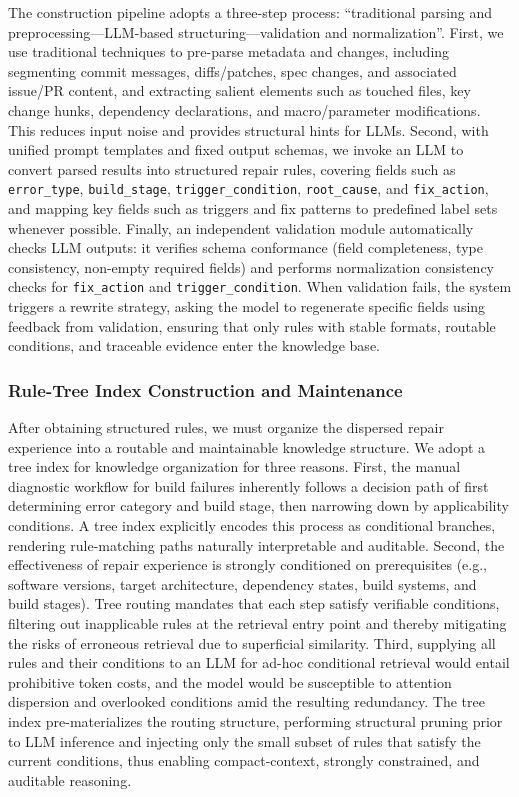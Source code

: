 \documentclass[sigconf]{acmart}
\begin{document}
\begin{sloppypar}
The construction pipeline adopts a three-step process: ``traditional parsing and preprocessing---LLM-based structuring---validation and normalization''. First, we use traditional techniques to pre-parse metadata and changes, including segmenting commit messages, diffs/patches, spec changes, and associated issue/PR content, and extracting salient elements such as touched files, key change hunks, dependency declarations, and macro/parameter modifications. This reduces input noise and provides structural hints for LLMs. Second, with unified prompt templates and fixed output schemas, we invoke an LLM to convert parsed results into structured repair rules, covering fields such as \texttt{error\_type}, \texttt{build\_stage}, \texttt{trigger\_condition}, \texttt{root\_cause}, and \texttt{fix\_action}, and mapping key fields such as triggers and fix patterns to predefined label sets whenever possible. Finally, an independent validation module automatically checks LLM outputs: it verifies schema conformance (field completeness, type consistency, non-empty required fields) and performs normalization consistency checks for \texttt{fix\_action} and \texttt{trigger\_condition}. When validation fails, the system triggers a rewrite strategy, asking the model to regenerate specific fields using feedback from validation, ensuring that only rules with stable formats, routable conditions, and traceable evidence enter the knowledge base.
\end{sloppypar}

\subsubsection{Rule-Tree Index Construction and Maintenance}

After obtaining structured rules, we must organize the dispersed repair experience into a routable and maintainable knowledge structure. We adopt a tree index for knowledge organization for three reasons. First, the manual diagnostic workflow for build failures inherently follows a decision path of first determining error category and build stage, then narrowing down by applicability conditions. A tree index explicitly encodes this process as conditional branches, rendering rule-matching paths naturally interpretable and auditable. Second, the effectiveness of repair experience is strongly conditioned on prerequisites (e.g., software versions, target architecture, dependency states, build systems, and build stages). Tree routing mandates that each step satisfy verifiable conditions, filtering out inapplicable rules at the retrieval entry point and thereby mitigating the risks of erroneous retrieval due to superficial similarity. Third, supplying all rules and their conditions to an LLM for ad-hoc conditional retrieval would entail prohibitive token costs, and the model would be susceptible to attention dispersion and overlooked conditions amid the resulting redundancy. The tree index pre-materializes the routing structure, performing structural pruning prior to LLM inference and injecting only the small subset of rules that satisfy the current conditions, thus enabling compact-context, strongly constrained, and auditable reasoning.
\end{document}
